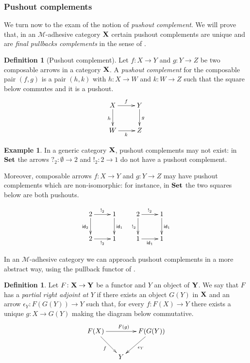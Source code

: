 \documentclass[a4paper]{article}
\newcommand{\id}[1]{\mathsf{id}_{#1}}
\def\X{\textbf {\textup{X}}}
\def\Y{\textbf {\textup{Y}}}
\def\Set{\textbf {\textup{Set}}}
\theoremstyle{definition}
\newtheorem{definition}[theorem]{Definition}
\newtheorem{example}[theorem]{Example}
\begin{document}
\subsubsection{Pushout complements}

We turn now to the exam of the notion of \emph{pushout complement}. We will prove that, in an $\mathcal{M}$-adhesive category $\X$ certain pushout complements are unique and are \emph{final pullbacks complements} in the sense of \cite{dyckhoff1987exponentiable,corradini2006sesqui}.

\begin{definition}[Pushout complement]
Let $f\colon X\to Y$ and $g\colon Y\to Z$ be two composable arrows in a category $\X$. A \emph{pushout complement} for the composable pair $(f,g)$ is a pair $(h,k)$ with $h\colon X\to W$ and $k\colon W\to Z$ such that the square below commutes and it is a pushout.
\[\xymatrix{X \ar[r]^{f} \ar[d]_{h}& Y \ar[d]^{g} \\ W \ar[r]_{k}& Z}\]
\end{definition}

\begin{example}
	In a generic category $\X$, pushout complements may not exist: in $\Set$ the arrows $?_{2}\colon \emptyset \to 2$ and $!_2\colon 2\to 1$ do not have a pushout complement.
	
	Moreover, composable arrows $f\colon X\to Y$ and $g\colon Y\to Z$ may have  pushout complements which are non-isomorphic: for instance, in $\Set$ the two squares below are both pushouts.
	
	\[\xymatrix{2 \ar[r]^{!_2} \ar[d]_{\id{2}}& 1 \ar[d]^{\id{1}} & 2 \ar[r]^{!_2} \ar[d]_{!_2}& 1 \ar[d]^{\id{1}}\\ 2 \ar[r]_{!_2}& 1 & 1 \ar[r]_{\id{1}}& 1}\]
\end{example}


In an $\mathcal{M}$-adhesive category we can approach pushout complements in a more abstract way, using the pullback functor of .

\begin{definition}
Let $F\colon \X \to \Y$ be a functor and $Y$ an object of $\Y$. We say that $F$ has a \emph{partial right adjoint at $Y$} if there exists an object $G(Y)$ in $\X$ and an arrow $\epsilon_Y\colon F(G(Y))\to Y$ such that, for every  $f\colon F(X)\to Y$ there exists a unique $g\colon X\to G(Y)$ making the diagram below commutative.
\[\xymatrix@C=15pt{F(X) \ar[rr]^{F(g)} \ar[dr]_{f}&&F(G(Y)) \ar[dl]^{\epsilon_Y}\\ & Y}\]
\end{definition} 
\end{document}
